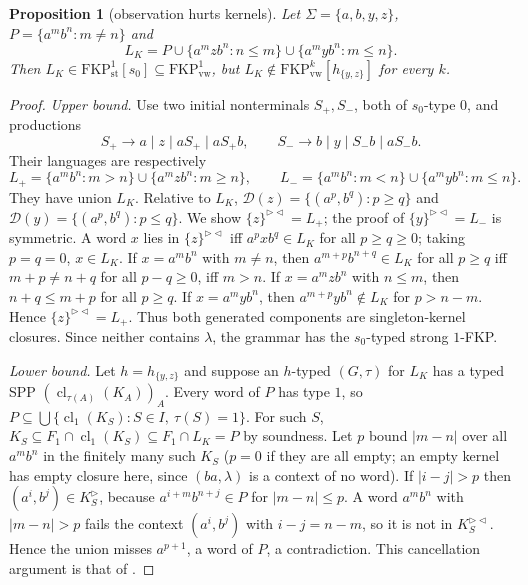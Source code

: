 \documentclass[11pt]{article}
\numberwithin{equation}{section}
\theoremstyle{plain}
\newtheorem{proposition}[theorem]{Proposition}
\theoremstyle{definition}
\theoremstyle{remark}
\theoremstyle{plain}
\newcommand{\eps}{\lambda}
\newcommand{\R}{^{\rhd}}
\newcommand{\RL}{^{\rhd\lhd}}
\newcommand{\cl}{\operatorname{cl}}
\newcommand{\D}{\mathcal D}
\newcommand{\FKP}[2]{\mathrm{FKP}^{#1}_{\mathrm{#2}}}
\newcommand{\tFKP}[3]{\mathrm{FKP}^{#1}_{\mathrm{#2}}[#3]}
\begin{document}
\begin{proposition}[observation hurts kernels]\label{prop:strict-kernel}
Let $\Sigma=\{a,b,y,z\}$, $P=\{a^mb^n:m\ne n\}$ and
\[
L_K=P\cup\{a^mzb^n:n\le m\}\cup\{a^myb^n:m\le n\}.
\]
Then $L_K\in\tFKP1{st}{s_0}\subseteq\FKP1{vw}$, but
$L_K\notin\tFKP{k}{vw}{h_{\{y,z\}}}$ for every $k$.
\end{proposition}
\begin{proof}
\emph{Upper bound.}  Use two initial nonterminals $S_+,S_-$, both of
$s_0$-type $0$, and productions
\[
S_+\to a\mid z\mid aS_+\mid aS_+b,\qquad
S_-\to b\mid y\mid S_-b\mid aS_-b.
\]
Their languages are respectively
\[
L_+=\{a^mb^n:m>n\}\cup\{a^mzb^n:m\ge n\},\qquad
L_-=\{a^mb^n:m<n\}\cup\{a^myb^n:m\le n\}.
\]
They have union $L_K$.  Relative to $L_K$,
$\D(z)=\{(a^p,b^q):p\ge q\}$ and
$\D(y)=\{(a^p,b^q):p\le q\}$.
We show $\{z\}\RL=L_+$; the proof of $\{y\}\RL=L_-$ is symmetric.  A word
$x$ lies in $\{z\}\RL$ iff $a^pxb^q\in L_K$ for all $p\ge q\ge0$; taking
$p=q=0$, $x\in L_K$.  If $x=a^mb^n$ with $m\ne n$, then $a^{m+p}b^{n+q}\in L_K$
for all $p\ge q$ iff $m+p\ne n+q$ for all $p-q\ge0$, iff $m>n$.  If
$x=a^mzb^n$ with $n\le m$, then $n+q\le m+p$ for all $p\ge q$.  If
$x=a^myb^n$, then $a^{m+p}yb^{n}\notin L_K$ for $p>n-m$.  Hence
$\{z\}\RL=L_+$.  Thus both generated components are singleton-kernel
closures.  Since neither contains $\eps$, the grammar
has the $s_0$-typed strong $1$-FKP.

\emph{Lower bound.}  Let $h=h_{\{y,z\}}$ and suppose an $h$-typed $(G,\tau)$
for $L_K$ has a typed SPP $(\cl_{\tau(A)}(K_A))_A$.  Every word of $P$ has
type $1$, so $P\subseteq\bigcup\{\cl_1(K_S):S\in I,\ \tau(S)=1\}$.  For such
$S$, $K_S\subseteq F_1\cap\cl_1(K_S)\subseteq F_1\cap L_K=P$ by soundness.  Let
$p$ bound $|m-n|$ over all $a^mb^n$ in the finitely many such $K_S$
($p=0$ if they are all empty; an empty kernel has empty closure here,
since $(ba,\eps)$ is a context of no word).  If
$|i-j|>p$ then $(a^i,b^j)\in K_S\R$, because $a^{i+m}b^{n+j}\in P$ for
$|m-n|\le p$.  A word $a^mb^n$ with $|m-n|>p$ fails the context
$(a^i,b^j)$ with $i-j=n-m$, so it is not in $K_S\RL$.  Hence the union
misses $a^{p+1}$, a word of $P$, a contradiction.  This cancellation
argument is that of \citet[Prop.~2(ii)]{ky2017}.
\end{proof}
\end{document}

